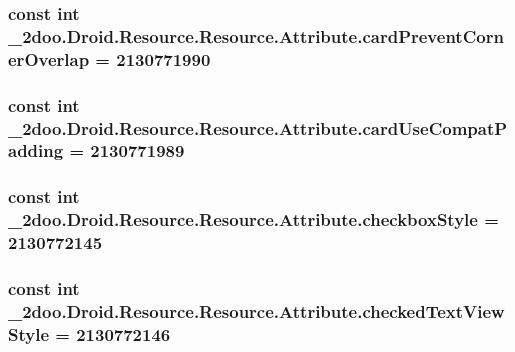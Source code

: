 \hypertarget{class__2doo_1_1_droid_1_1_resource_1_1_attribute_fd9af77cecb192a2132f120e86b576b0}{
\subsubsection[{cardPreventCornerOverlap}]{\setlength{\rightskip}{0pt plus 5cm}const int \_\-2doo.Droid.Resource.Resource.Attribute.cardPreventCornerOverlap = 2130771990}}
\label{class__2doo_1_1_droid_1_1_resource_1_1_attribute_fd9af77cecb192a2132f120e86b576b0}


\hypertarget{class__2doo_1_1_droid_1_1_resource_1_1_attribute_19bdf202ea5570c65e6b3dbd0cb14856}{
\subsubsection[{cardUseCompatPadding}]{\setlength{\rightskip}{0pt plus 5cm}const int \_\-2doo.Droid.Resource.Resource.Attribute.cardUseCompatPadding = 2130771989}}
\label{class__2doo_1_1_droid_1_1_resource_1_1_attribute_19bdf202ea5570c65e6b3dbd0cb14856}


\hypertarget{class__2doo_1_1_droid_1_1_resource_1_1_attribute_dcf1f1f1936eb18a79c5e86b82bc2c94}{
\subsubsection[{checkboxStyle}]{\setlength{\rightskip}{0pt plus 5cm}const int \_\-2doo.Droid.Resource.Resource.Attribute.checkboxStyle = 2130772145}}
\label{class__2doo_1_1_droid_1_1_resource_1_1_attribute_dcf1f1f1936eb18a79c5e86b82bc2c94}


\hypertarget{class__2doo_1_1_droid_1_1_resource_1_1_attribute_9e3ebbadebc1b437156766a8997f36e9}{
\subsubsection[{checkedTextViewStyle}]{\setlength{\rightskip}{0pt plus 5cm}const int \_\-2doo.Droid.Resource.Resource.Attribute.checkedTextViewStyle = 2130772146}}
\label{class__2doo_1_1_droid_1_1_resource_1_1_attribute_9e3ebbadebc1b437156766a8997f36e9}


